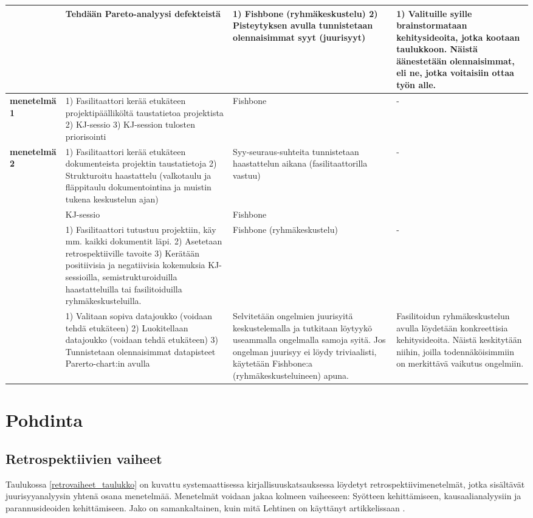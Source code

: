 \begin{center}
\begin{longtable}{|p{3cm}|p{4cm}|p{4cm}|p{4cm}|}
	\textbf{\citep{staalhane2004root}} & Tehdään Pareto-analyysi defekteistä & 1) Fishbone (ryhmäkeskustelu) 2) Pisteytyksen avulla tunnistetaan olennaisimmat syyt (juurisyyt) & 1) Valituille syille brainstormataan kehitysideoita, jotka kootaan taulukkoon. Näistä äänestetään olennaisimmat, eli ne, jotka voitaisiin ottaa työn alle. \\ \hline
	\textbf{\citep{staalhane2003post} menetelmä 1} & 1) Fasilitaattori kerää etukäteen projektipäälliköltä taustatietoa projektista 2) KJ-sessio 3) KJ-session tulosten priorisointi & Fishbone & - \\ \hline
	\textbf{\citep{staalhane2003post} menetelmä 2} & 1) Fasilitaattori kerää etukäteen dokumenteista projektin taustatietoja 2) Strukturoitu haastattelu (valkotaulu ja fläppitaulu dokumentointina ja muistin tukena keskustelun ajan) & Syy-seuraus-suhteita tunnistetaan haastattelun aikana (fasilitaattorilla vastuu) & - \\ \hline
	\textbf{\citep{dingsoyr2003extending}} & KJ-sessio & Fishbone &  \\ \hline
	\textbf{\citep{birk2002postmortem}} & 1) Fasilitaattori tutustuu projektiin, käy mm. kaikki dokumentit läpi. 2) Asetetaan retrospektiiville tavoite 3) Kerätään positiivisia ja negatiivisia kokemuksia KJ-sessioilla,  semistrukturoiduilla haastatteluilla tai fasilitoiduilla ryhmäkeskusteluilla. & Fishbone (ryhmäkeskustelu) & - \\ \hline
	\textbf{\citep{card1998learning}} & 1) Valitaan sopiva datajoukko (voidaan tehdä etukäteen) 2) Luokitellaan datajoukko (voidaan tehdä etukäteen) 3) Tunnistetaan olennaisimmat datapisteet Parerto-chart:in avulla & Selvitetään ongelmien juurisyitä keskustelemalla ja tutkitaan löytyykö useammalla ongelmalla samoja syitä. Jos ongelman juurisyy ei löydy triviaalisti, käytetään Fishbone:a (ryhmäkeskusteluineen) apuna. & Fasilitoidun ryhmäkeskustelun avulla löydetään konkreettisia kehitysideoita. Näistä keskitytään niihin, joilla todennäköisimmiin on merkittävä vaikutus ongelmiin. \\ \hline
\end{longtable}
\end{center}


\section{Pohdinta}
\subsection{Retrospektiivien vaiheet}
Taulukossa \ref{retrovaiheet_taulukko} on kuvattu systemaattisessa kirjallisuuskatsauksessa löydetyt retrospektiivimenetelmät, jotka sisältävät juurisyyanalyysin yhtenä osana menetelmää.
Menetelmät voidaan jakaa kolmeen vaiheeseen: Syötteen kehittämiseen, kausaalianalyysiin ja parannusideoiden kehittämiseen. Jako on samankaltainen, kuin mitä Lehtinen on käyttänyt artikkelissaan \citep{Lehtinen2011}.

